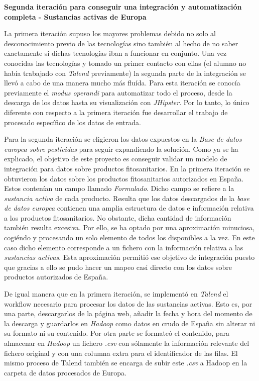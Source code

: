 \bigskip
\par 
\textbf{Segunda iteración para conseguir una integración y automatización completa - Sustancias activas de Europa}
\bigskip
\par 
La primera iteración supuso los mayores problemas debido no solo al desconocimiento previo de las tecnologías sino también al hecho de no saber exactamente si dichas tecnologías iban a funcionar en conjunto. Una vez conocidas las tecnologías y tomado un primer contacto con ellas (el alumno no había trabajado con \textit{Talend} previamente) la segunda parte de la integración se llevó a cabo de una manera mucho más fluída. Para esta iteración se conocía previamente el \textit{modus operandi} para automatizar todo el proceso, desde la descarga de los datos hasta su visualización con \textit{JHipster}. Por lo tanto, lo único diferente con respecto a la primera iteración fue desarrollar el trabajo de procesado específico de los datos de entrada. 
\par  
Para la segunda iteración se eligieron los datos expuestos en la \textit{Base de datos europea sobre pesticidas} \cite{pesticides_eu} para seguir expandiendo la solución. Como ya se ha explicado, el objetivo de este proyecto es conseguir validar un modelo de integración para datos sobre productos fitosanitarios. En la primera iteración se obtuvieron los datos sobre los productos fitosanitarios autorizados en España. Estos contenían un campo llamado \textit{Formulado}. Dicho campo se refiere a la \textit{sustancia activa} de cada producto. Resulta que los datos descargados de la \textit{base de datos europea} contienen una amplia estructura de datos e información relativa a los productos fitosanitarios. No obstante, dicha cantidad de información también resulta excesiva. Por ello, se ha optado por una aproximación minuciosa, cogiéndo y procesando un solo elemento de todos los disponibles a la vez. En este caso dicho elemento corresponde a un fichero con la información relativa a las \textit{sustancias activas}. Esta aproximación permitió ese objetivo de integración puesto que gracias a ello se pudo hacer un mapeo casi directo con los datos sobre productos autorizados de España. 
\par 
De igual manera que en la primera iteración, se implementó en \textit{Talend} el workflow necesario para procesar los datos de las sustancias activas. Esto es, por una parte, descargarlos de la página web, añadir la fecha y hora del momento de la descarga y guardarlos en \textit{Hadoop} como datos en crudo de España sin alterar ni su formato ni su contenido. Por otra parte se formateó el contenido, para almacenar en \textit{Hadoop} un fichero \textit{.csv} con sólamente la información relevante del fichero original y con una columna extra para el identificador de las filas. El mismo proceso de Talend también se encarga de subir este \textit{.csv} a Hadoop en la carpeta de datos procesados de Europa. 
